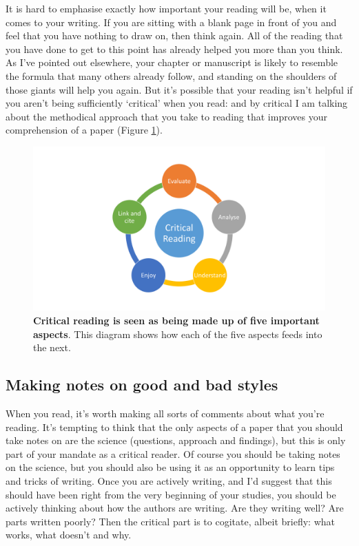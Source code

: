\documentclass[
]{krantz}
\begin{document}
It is hard to emphasise exactly how important your reading will be, when it comes to your writing. If you are sitting with a blank page in front of you and feel that you have nothing to draw on, then think again. All of the reading that you have done to get to this point has already helped you more than you think. As I've pointed out elsewhere, your chapter or manuscript is likely to resemble the formula that many others already follow, and standing on the shoulders of those giants will help you again. But it's possible that your reading isn't helpful if you aren't being sufficiently `critical' when you read: and by critical I am talking about the methodical approach that you take to reading that improves your comprehension of a paper (Figure \ref{fig:Criticalreading}).



\begin{figure}
\includegraphics[width=0.95\linewidth]{figures/Criticalreading} \caption{\textbf{Critical reading is seen as being made up of five important aspects}. This diagram shows how each of the five aspects feeds into the next.}\label{fig:Criticalreading}
\end{figure}

\hypertarget{making-notes-on-good-and-bad-styles}{%
\subsection{Making notes on good and bad styles}\label{making-notes-on-good-and-bad-styles}}

When you read, it's worth making all sorts of comments about what you're reading. It's tempting to think that the only aspects of a paper that you should take notes on are the science (questions, approach and findings), but this is only part of your mandate as a critical reader. Of course you should be taking notes on the science, but you should also be using it as an opportunity to learn tips and tricks of writing. Once you are actively writing, and I'd suggest that this should have been right from the very beginning of your studies, you should be actively thinking about how the authors are writing. Are they writing well? Are parts written poorly? Then the critical part is to cogitate, albeit briefly: what works, what doesn't and why.
\end{document}
